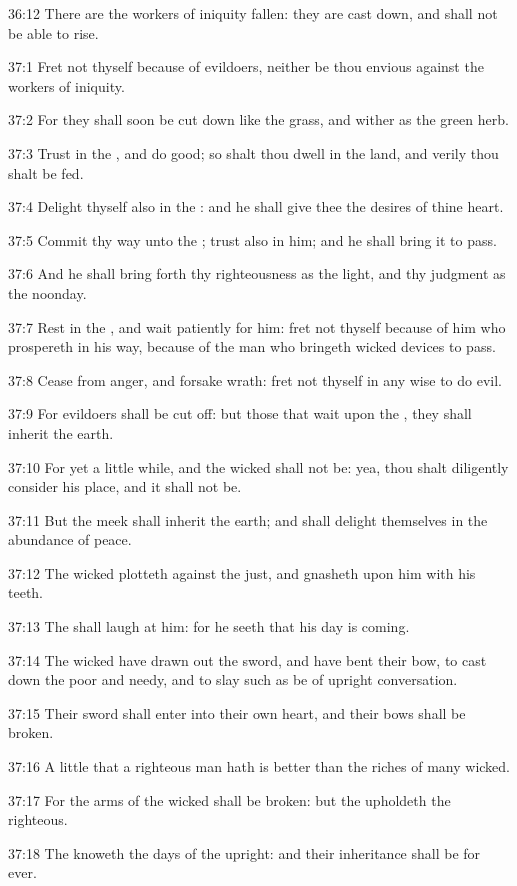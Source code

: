 36:12 There are the workers of iniquity fallen: they are cast down,
and shall not be able to rise.



37:1 Fret not thyself because of evildoers, neither be thou envious
against the workers of iniquity.

37:2 For they shall soon be cut down like the grass, and wither as the
green herb.

37:3 Trust in the \LORD, and do good; so shalt thou dwell in the land,
and verily thou shalt be fed.

37:4 Delight thyself also in the \LORD: and he shall give thee the
desires of thine heart.

37:5 Commit thy way unto the \LORD; trust also in him; and he shall
bring it to pass.

37:6 And he shall bring forth thy righteousness as the light, and thy
judgment as the noonday.

37:7 Rest in the \LORD, and wait patiently for him: fret not thyself
because of him who prospereth in his way, because of the man who
bringeth wicked devices to pass.

37:8 Cease from anger, and forsake wrath: fret not thyself in any wise
to do evil.

37:9 For evildoers shall be cut off: but those that wait upon the
\LORD, they shall inherit the earth.

37:10 For yet a little while, and the wicked shall not be: yea, thou
shalt diligently consider his place, and it shall not be.

37:11 But the meek shall inherit the earth; and shall delight
themselves in the abundance of peace.

37:12 The wicked plotteth against the just, and gnasheth upon him with
his teeth.

37:13 The \LORD shall laugh at him: for he seeth that his day is
coming.

37:14 The wicked have drawn out the sword, and have bent their bow, to
cast down the poor and needy, and to slay such as be of upright
conversation.

37:15 Their sword shall enter into their own heart, and their bows
shall be broken.

37:16 A little that a righteous man hath is better than the riches of
many wicked.

37:17 For the arms of the wicked shall be broken: but the \LORD
upholdeth the righteous.

37:18 The \LORD knoweth the days of the upright: and their inheritance
shall be for ever.

